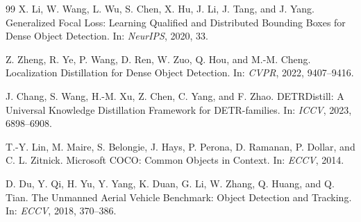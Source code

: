\begin{thebibliography}{99}
 X. Li, W. Wang, L. Wu, S. Chen, X. Hu, J. Li, J. Tang, and J. Yang. Generalized Focal Loss: Learning Qualified and Distributed Bounding Boxes for Dense Object Detection. In: \emph{NeurIPS}, 2020, 33.

 Z. Zheng, R. Ye, P. Wang, D. Ren, W. Zuo, Q. Hou, and M.-M. Cheng. Localization Distillation for Dense Object Detection. In: \emph{CVPR}, 2022, 9407--9416.

 J. Chang, S. Wang, H.-M. Xu, Z. Chen, C. Yang, and F. Zhao. DETRDistill: A Universal Knowledge Distillation Framework for DETR-families. In: \emph{ICCV}, 2023, 6898--6908.

 T.-Y. Lin, M. Maire, S. Belongie, J. Hays, P. Perona, D. Ramanan, P. Dollar, and C. L. Zitnick. Microsoft COCO: Common Objects in Context. In: \emph{ECCV}, 2014.

 D. Du, Y. Qi, H. Yu, Y. Yang, K. Duan, G. Li, W. Zhang, Q. Huang, and Q. Tian. The Unmanned Aerial Vehicle Benchmark: Object Detection and Tracking. In: \emph{ECCV}, 2018, 370--386.

\end{thebibliography}